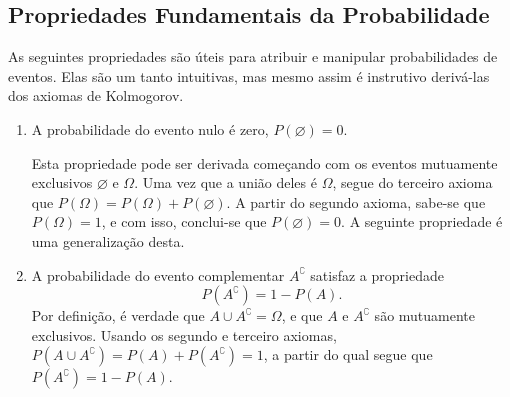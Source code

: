 \subsection{Propriedades Fundamentais da Probabilidade}

As seguintes propriedades são úteis para atribuir e manipular probabilidades de eventos. Elas são um tanto intuitivas, mas mesmo assim é instrutivo derivá-las dos axiomas de Kolmogorov.

\begin{enumerate}[noitemsep]
\item A probabilidade do evento nulo é zero, $P(\varnothing) = 0$.

Esta propriedade pode ser derivada começando com os eventos mutuamente exclusivos $\varnothing$ e $\Omega$. Uma vez que a união deles é $\Omega$, segue do terceiro axioma que $P(\Omega) = P(\Omega) + P(\varnothing)$. A partir do segundo axioma, sabe-se que $P(\Omega) = 1$, e com isso, conclui-se que $P(\varnothing) = 0$. A seguinte propriedade é uma generalização desta.

\item A probabilidade do evento complementar $A^\complement$ satisfaz a propriedade 
\begin{equation}
P(A^\complement) = 1 - P(A).
\end{equation}
Por definição, é verdade que $A \cup A^\complement = \Omega$, e que $A$ e $A^\complement$ são mutuamente exclusivos. Usando os segundo e terceiro axiomas, $P(A \cup A^\complement) = P(A) + P(A^\complement) = 1$, a partir do qual segue que $P(A^\complement) = 1 - P(A)$.


\end{enumerate}
